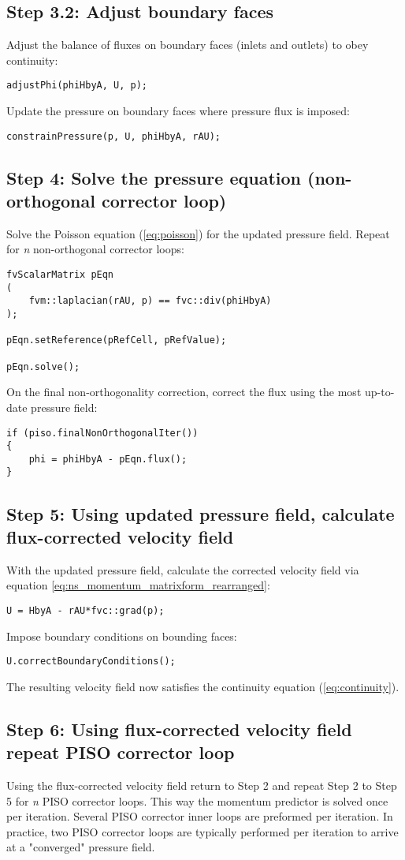 \documentclass[a4paper,11pt]{report}
\begin{document}
\subsection*{Step 3.2: Adjust boundary faces}
Adjust the balance of fluxes on boundary faces (inlets and outlets) to obey continuity: 
\begin{verbatim}
adjustPhi(phiHbyA, U, p);
\end{verbatim}
Update the pressure on boundary faces where pressure flux is imposed:
\begin{verbatim}
constrainPressure(p, U, phiHbyA, rAU);
\end{verbatim}

\subsection*{Step 4: Solve the pressure equation (non-orthogonal corrector loop)}
Solve the Poisson equation (\ref{eq:poisson}) for the updated pressure field. Repeat for \textit{n} non-orthogonal corrector loops:
\begin{verbatim}
fvScalarMatrix pEqn
(
    fvm::laplacian(rAU, p) == fvc::div(phiHbyA)
);

pEqn.setReference(pRefCell, pRefValue);

pEqn.solve();
\end{verbatim}
On the final non-orthogonality correction, correct the flux using the most up-to-date pressure field:
\begin{verbatim}
if (piso.finalNonOrthogonalIter())
{
    phi = phiHbyA - pEqn.flux();
}
\end{verbatim}

\subsection*{Step 5: Using updated pressure field, calculate flux-corrected velocity field}
With the updated pressure field, calculate the corrected velocity field via equation \ref{eq:ns_momentum_matrixform_rearranged}:
\begin{verbatim}
U = HbyA - rAU*fvc::grad(p);
\end{verbatim}
Impose boundary conditions on bounding faces:
\begin{verbatim}
U.correctBoundaryConditions();
\end{verbatim}
The resulting velocity field now satisfies the continuity equation (\ref{eq:continuity}).

\subsection*{Step 6: Using flux-corrected velocity field repeat PISO corrector loop}
Using the flux-corrected velocity field return to Step 2 and repeat Step 2 to Step 5 for \textit{n} PISO corrector loops. This way the momentum predictor is solved once per iteration. Several PISO corrector inner loops are preformed per iteration. In practice, two PISO corrector loops are typically performed per iteration to arrive at a "converged" pressure field.
\end{document}
